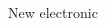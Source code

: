 \documentclass[10pt]{beamer}
\begin{document}
\begin{frame}[shrink=2]{ New electronic}
\begin{columns}
\begin{column}{0.5\textwidth}
\end{column}
\end{columns}
\end{frame}
\end{document}
